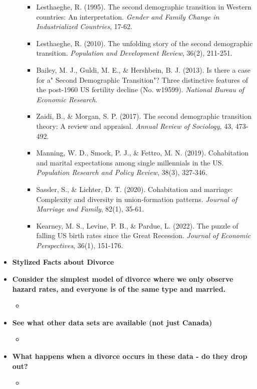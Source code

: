 \documentclass{article}
\begin{document}
\begin{itemize}
\begin{itemize}
\begin{itemize}
\item Lesthaeghe, R. (1995). The second demographic transition in Western countries: An interpretation. \textit{Gender and Family Change in Industrialized Countries}, 17-62.
\item Lesthaeghe, R. (2010). The unfolding story of the second demographic transition. \textit{Population and Development Review}, 36(2), 211-251.
\item Bailey, M. J., Guldi, M. E., \& Hershbein, B. J. (2013). Is there a case for a" Second Demographic Transition"? Three distinctive features of the post-1960 US fertility decline (No. w19599).  \textit{National Bureau of Economic Research}.
\item Zaidi, B., \& Morgan, S. P. (2017). The second demographic transition theory: A review and appraisal. \textit{Annual Review of Sociology}, 43, 473-492.
\item Manning, W. D., Smock, P. J., \& Fettro, M. N. (2019). Cohabitation and marital expectations among single millennials in the US. \textit{Population Research and Policy Review}, 38(3), 327-346.
\item Sassler, S., \& Lichter, D. T. (2020). Cohabitation and marriage: Complexity and diversity in union‐formation patterns. \textit{Journal of Marriage and Family}, 82(1), 35-61.
\item Kearney, M. S., Levine, P. B., \& Pardue, L. (2022). The puzzle of falling US birth rates since the Great Recession. \textit{Journal of Economic Perspectives}, 36(1), 151-176.
\end{itemize}


\end{itemize}

\item \textbf{Stylized Facts about Divorce}

\item \textbf{Consider the simplest model of divorce where we only observe hazard rates, and everyone is of the same type and married.}
\begin{itemize}
\item
\end{itemize}

\item \textbf{See what other data sets are available (not just Canada)}
\begin{itemize}
\item
\end{itemize}
\item \textbf{What happens when a divorce occurs in these data - do they drop out?}
\begin{itemize}
\item
\end{itemize}
\end{itemize}

\newpage
\end{document}
